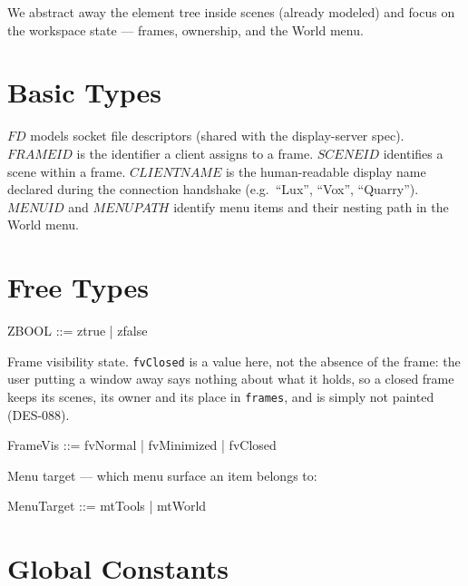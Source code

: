 \documentclass[a4paper,10pt,fleqn]{article}
\begin{document}
We abstract away the element tree inside scenes (already modeled) and
focus on the workspace state --- frames, ownership, and the World menu.

\section{Basic Types}

\begin{zed}
\end{zed}

$FD$ models socket file descriptors (shared with the display-server
spec).  $FRAMEID$ is the identifier a client assigns to a frame.
$SCENEID$ identifies a scene within a frame.  $CLIENTNAME$ is the
human-readable display name declared during the connection handshake
(e.g.\ ``Lux'', ``Vox'', ``Quarry'').  $MENUID$ and $MENUPATH$
identify menu items and their nesting path in the World menu.

\section{Free Types}

\begin{zed}
  ZBOOL ::= ztrue | zfalse
\end{zed}

Frame visibility state.  \texttt{fvClosed} is a value here, not the
absence of the frame: the user putting a window away says nothing about
what it holds, so a closed frame keeps its scenes, its owner and its
place in \texttt{frames}, and is simply not painted (DES-088).
\begin{zed}
  FrameVis ::= fvNormal | fvMinimized | fvClosed
\end{zed}

Menu target --- which menu surface an item belongs to:
\begin{zed}
  MenuTarget ::= mtTools | mtWorld
\end{zed}

\section{Global Constants}
\end{document}
